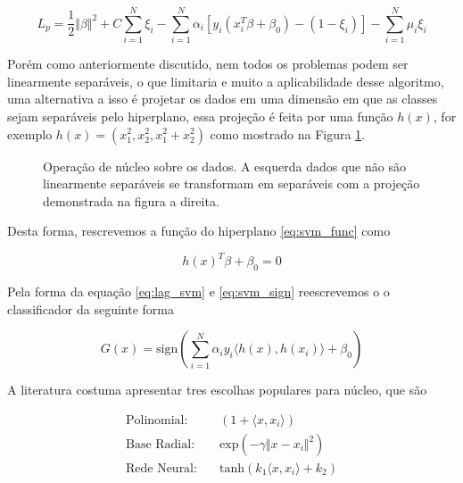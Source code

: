 \begin{equation}
    \label{eq:lag_svm}
    L_p = \frac{1}{2}\Vert\beta\Vert^2 + C\sum_{i=1}^{N}\xi_i -
    \sum_{i=1}^{N}\alpha_i [y_i(x_i^T\beta+\beta_0) - (1-\xi_i)] -
    \sum_{i=1}^{N}\mu_i\xi_i
\end{equation}

Porém como anteriormente discutido, nem todos os problemas podem ser
linearmente separáveis, o que limitaria e muito a aplicabilidade desse
algoritmo, uma alternativa a isso é projetar os dados em uma dimensão em que as
classes sejam separáveis pelo hiperplano, essa projeção é feita por uma função
$h(x)$, for exemplo $h(x) = (x_1^2, x_2^2, x_1^2+x_2^2)$ como mostrado na
Figura \ref{fig:svm_kernel}.

\begin{figure}[ht]
   \centering
    \def\svgwidth{\linewidth}
    \caption{Operação de núcleo sobre os dados. A esquerda dados que não são
    linearmente separáveis se transformam em separáveis com a projeção
    demonstrada na figura a direita.}
    \label{fig:svm_kernel}
\end{figure}

Desta forma, rescrevemos a função do hiperplano \ref{eq:svm_func} como

 \begin{equation}
    \label{eq:svm_kernel}
    h(x)^T\beta + \beta_0 = 0
\end{equation}

Pela forma da equação \ref{eq:lag_svm} e \ref{eq:svm_sign} reescrevemos o
o classificador da seguinte forma

\begin{equation}
    G(x) = \text{sign}
    \left(\sum_{i=1}^N \alpha_i y_i \langle h(x),h(x_i)\rangle+\beta_0 \right)
\end{equation}

A literatura costuma apresentar tres escolhas populares para núcleo, que são

\begin{equation}
    \begin{split}
        \text{Polinomial:} &\quad (1+\langle x,x_i\rangle)\\
        \text{Base Radial:} &\quad \text{exp}(-\gamma \Vert x - x_i\Vert^2)\\
        \text{Rede Neural:} &\quad \text{tanh}(k_1\langle x,x_i\rangle+k_2)
    \end{split}
\end{equation}

